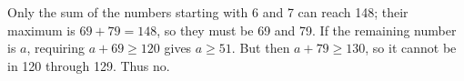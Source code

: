 Only the sum of the numbers starting with 6 and 7 can reach 148; their maximum is $69+79=148$, so they must be 69 and 79. If the remaining number is $a$, requiring $a+69\ge120$ gives $a\ge51$. But then $a+79\ge130$, so it cannot be in 120 through 129. Thus $\boxed{\text{no}}$.
